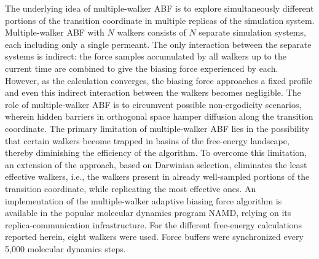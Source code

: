  {\color{red} The underlying idea of multiple-walker ABF is to explore simultaneously different portions of the transition coordinate in multiple replicas of the simulation system.
Multiple-walker ABF with $N$ walkers consists of $N$ separate simulation systems, each including only a single permeant. The only interaction between the separate systems is indirect: the force samples accumulated by all walkers up to the current time are combined to give the biasing force experienced by each. However, as the calculation converges, the biasing force approaches a fixed profile and even this indirect interaction between the walkers becomes negligible. The role of multiple-walker ABF is to circumvent possible non-ergodicity scenarios, wherein hidden barriers in orthogonal space hamper diffusion along the transition coordinate. The primary limitation of multiple-walker ABF lies in the possibility that certain walkers become trapped in basins of the free-energy landscape, thereby diminishing the efficiency of the algorithm.
To overcome this limitation, an extension of the approach, based on
Darwinian selection, eliminates the least effective walkers, i.e., the walkers
present in already well-sampled portions of the transition coordinate,
while replicating
the most effective ones\cite{Minoukadeh2010,Comer2014c}.}
An implementation of the multiple-walker adaptive biasing force algorithm is available in the  popular molecular dynamics program NAMD\cite{Phillips2005}, relying on its replica-communication infrastructure. For the different free-energy calculations reported herein, eight walkers were used. Force buffers were synchronized every 5,000 molecular dynamics steps.

